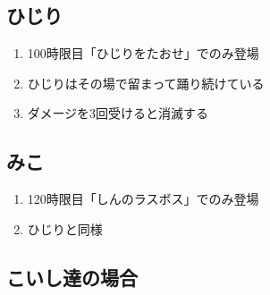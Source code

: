 \clearpage


\subsection{ひじり}
\begin{enumerate}[label={\sarrow}]
\item 100時限目「ひじりをたおせ」でのみ登場
\item ひじりはその場で留まって踊り続けている
\item ダメージを3回受けると消滅する
\end{enumerate}


\subsection{みこ}
\begin{enumerate}[label={\sarrow}]
\item 120時限目「しんのラスボス」でのみ登場
\item ひじりと同様
\end{enumerate}



\clearpage


\subsection{こいし達の場合}

